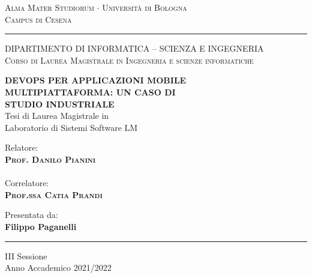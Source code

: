 \documentclass[12pt,a4paper]{report}
\begin{document}
  
\begin{titlepage}
\begin{center}
{{\Large{\textsc{Alma Mater Studiorum $\cdot$ Universit\`a di
Bologna\\\vspace{2mm}Campus di Cesena}}}} \rule[0.1cm]{15.8cm}{0.2mm}

{\small{\textsc { DIPARTIMENTO DI INFORMATICA – SCIENZA E INGEGNERIA \\
\vspace{3mm}
Corso di Laurea Magistrale in Ingegneria e scienze informatiche}}}
\end{center}
\vspace{15mm}
\begin{center}
{\LARGE\textbf{DEVOPS PER APPLICAZIONI MOBILE}} \\
\vspace{3mm}
{\LARGE\textbf{MULTIPIATTAFORMA: UN CASO DI}} \\
\vspace{3mm}
{\LARGE\textbf{STUDIO INDUSTRIALE}} \\
\vspace{20mm} {\large{\sc Tesi di Laurea Magistrale in\\ Laboratorio di Sistemi Software LM}}
\end{center}
\vfill
\par
\noindent

\begin{minipage}[t]{0.47\textwidth}
{\large{\sc Relatore:}\\
{\bf \textsc{Prof. Danilo Pianini}}}\\ \\
{\large{\sc Correlatore:}\\
{\bf \textsc{Prof.ssa Catia Prandi}}}\\
\vskip 8pt
\end{minipage}
\hfill
\begin{minipage}[t]{0.47\textwidth}\raggedleft
{\large{\sc Presentata da:}\\
{\bf Filippo Paganelli}}
\end{minipage}
\vspace{20mm}
\begin{center}
\rule[0.1cm]{15.8cm}{0.2mm}
{\large{\sc III Sessione\\
Anno Accademico 2021/2022}}
\end{center}
\end{titlepage}
\end{document}
